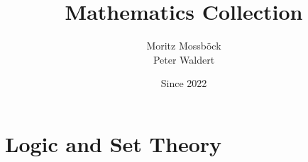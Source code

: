 \documentclass{report}
\author{Moritz Mossböck \\ Peter Waldert}
\title{Mathematics Collection}
\date{Since 2022}
\begin{document}
    
    \chapter{Logic and Set Theory}
    
\end{document}
